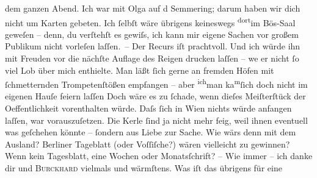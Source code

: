 \begin{ledgroupsized}[t]{13cm}
               dem ganzen Abend. Ich war mit Olga auf d Semmering; darum haben wir dich nicht um Karten
               gebeten. Ich ſelbſt wäre übrigens keineswegs \substVorne{}\textsuperscript{dort}\substDazwischen{}im Bös-Saal\substHinten{} geweſen – denn, du verſtehſt es gewiſs, ich kann mir eigene Sachen vor
               großem Publikum nicht vorleſen laſſen. –\pend
           \pstart
           Der Recurs iſt prachtvoll. Und ich würde ihn mit Freuden vor die nächſte {\pb}Auflage des Reigen drucken laſſen – we{\geminationn} er nicht ſo viel Lob über mich enthielte. Man läßt
               ſich gerne an fremden Höfen mit ſchmetternden Trompetenſtößen empfangen – aber \substVorne{}\textsuperscript{ich}\substDazwischen{}man\substHinten{} ka{\geminationn}\substVorne{}\textsuperscript{m}\substDazwischen{}ſ\substHinten{}ich doch nicht im eigenen Hauſe feiern laſſen{\dotstwo}
               Doch wäre es zu ſchade, wenn dieſes Meiſterſtück der Oeffentlichkeit vorenthalten
               würde. Daſs ſich in Wien nichts würde anfangen
               laſſen, war vorauszuſetzen. Die Kerle ſind ja nicht mehr feig, weil ihnen even{\pb}tuell was geſchehen
               könnte – ſondern aus Liebe zur Sache. Wie wärs denn mit dem Ausland? Berliner Tageblatt (oder Voſſiſche?) wären vielleicht zu gewinnen? Wenn kein Tagesblatt, eine Wochen
               oder Monatsſchrift? – Wie immer – ich danke dir und \textsc{Burckhard} vielmals und wärmſtens. Was iſt das übrigens für eine \label{K_L01338_1v}
\end{ledgroupsized}
